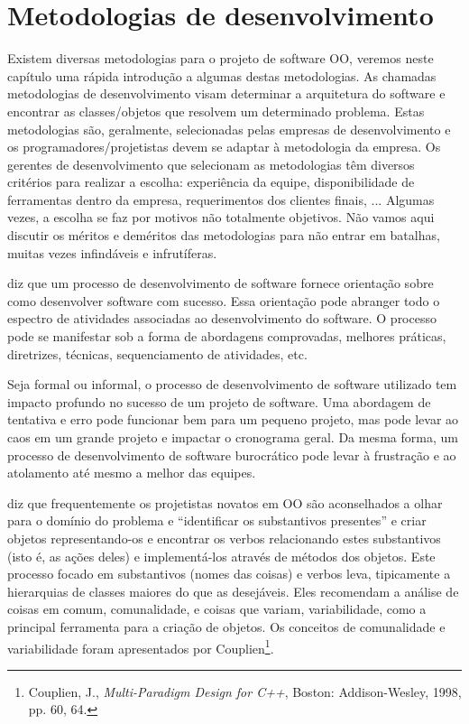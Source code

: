 \documentclass[
	11pt,				%
	openright,
	twoside,			%
	a4paper,			%
	english,			%
	french,
	brazil,				%
	sumario=tradicional
	]{abntex2}
\begin{document}
\chapter{Metodologias de desenvolvimento}

Existem diversas metodologias para o projeto de software OO, veremos neste capítulo uma rápida introdução a algumas destas metodologias. As chamadas metodologias de desenvolvimento visam determinar a arquitetura do software e encontrar as classes/objetos que resolvem um determinado problema. Estas metodologias são, geralmente, selecionadas pelas empresas de desenvolvimento e os programadores/projetistas devem se adaptar à metodologia da empresa. Os gerentes de desenvolvimento que selecionam as metodologias têm diversos critérios para realizar a escolha: experiência da equipe, disponibilidade de ferramentas dentro da empresa, requerimentos dos clientes finais, ... Algumas vezes, a escolha se faz por motivos não totalmente objetivos. Não vamos aqui discutir os méritos e deméritos das metodologias para não entrar em batalhas, muitas vezes infindáveis e infrutíferas.

\cite{uml:j2ee} diz que um processo de desenvolvimento de software fornece orientação sobre como desenvolver software com sucesso. Essa orientação pode abranger todo o espectro de atividades associadas ao desenvolvimento do software. O processo pode se manifestar sob a forma de abordagens comprovadas, melhores práticas, diretrizes, técnicas, sequenciamento de atividades, etc.

Seja formal ou informal, o processo de desenvolvimento de software utilizado tem impacto profundo no sucesso de um projeto de software. Uma abordagem de tentativa e erro pode funcionar bem para um pequeno projeto, mas pode levar ao caos em um grande projeto e impactar o cronograma geral. Da mesma forma, um processo de desenvolvimento de software burocrático pode levar à frustração e ao atolamento até mesmo a melhor das equipes.

\cite{DP:explained} diz que frequentemente os projetistas novatos em OO são aconselhados a olhar para o domínio do problema e ``identificar os substantivos presentes'' e criar objetos representando-os e encontrar os verbos relacionando estes substantivos (isto é, as ações deles) e implementá-los através de métodos dos objetos. Este processo focado em substantivos (nomes das coisas) e verbos leva, tipicamente a hierarquias de classes maiores do que as desejáveis. Eles recomendam a análise de coisas em comum, comunalidade, e coisas que variam, variabilidade, como a principal ferramenta para a criação de objetos. Os conceitos de comunalidade e variabilidade foram apresentados por Couplien\footnote{Couplien, J., \textit{Multi-Paradigm Design for C++}, Boston: Addison-Wesley, 1998, pp. 60, 64.}.
\end{document}
